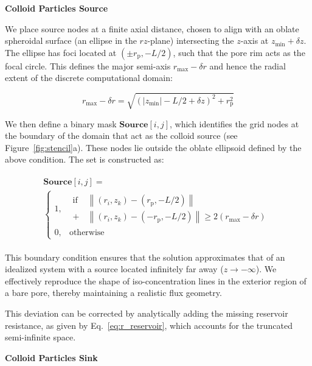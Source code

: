 \documentclass[10pt, a4paper, twocolumn]{article}
\begin{document}
\textbf{Colloid Particles Source}

We place source nodes at a finite axial distance, chosen to align with an oblate spheroidal surface (an ellipse in the $rz$-plane) intersecting the $z$-axis at $z_{\text{min}} + \delta z$.
The ellipse has foci located at $(\pm r_{\text{p}}, -L/2)$, such that the pore rim acts as the focal circle.
This defines the major semi-axis $r_{\text{max}} - \delta r$ and hence the radial extent of the discrete computational domain:

\begin{equation}
    r_{\text{max}} - \delta r = \sqrt{(|z_{\text{min}}| - L/2 + \delta z)^2 + r_{\text{p}}^2}
\end{equation}

We then define a binary mask $\textbf{Source}[i,j]$, which identifies the grid nodes at the boundary of the domain that act as the colloid source (see Figure~\ref{fig:stencil}a).
These nodes lie outside the oblate ellipsoid defined by the above condition.
The set is constructed as:

\begin{eqnarray}
    \begin{gathered}
        \textbf{Source}[i,j] = \\
        \begin{cases}
        1, & 
        \begin{aligned}
            \text{if } &\left\lVert (r_i, z_k) - (r_{\text{p}}, -L/2) \right\rVert \\
            +  &\left\lVert (r_i, z_k) - (-r_{\text{p}}, -L/2) \right\rVert \ge 2(r_{\text{max}} - \delta r)
        \end{aligned} \\
        0, & \text{otherwise}
        \end{cases}
    \end{gathered}
\end{eqnarray}

This boundary condition ensures that the solution approximates that of an idealized system with a source located infinitely far away ($z \to -\infty$).
We effectively reproduce the shape of iso-concentration lines in the exterior region of a bare pore, thereby maintaining a realistic flux geometry.

This deviation can be corrected by analytically adding the missing reservoir resistance, as given by Eq.~\ref{eq:r_reservoir}, which accounts for the truncated semi-infinite space.

\textbf{Colloid Particles Sink}
\end{document}
